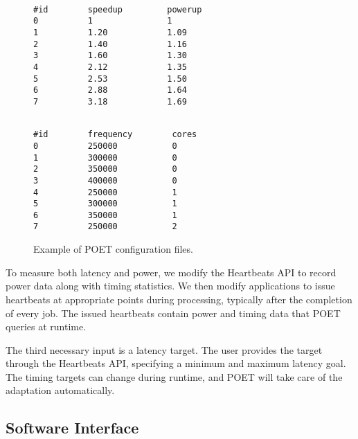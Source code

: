 \begin{figure}[t]
\centering
\begin{minipage}{.45\columnwidth}
\lstset{
  belowskip=0pt,
  aboveskip=0pt,
}
\begin{lstlisting}[frame=tlr,%
  caption={System-agnostic.},%
  label={lst:control_config_example}]%

#id        speedup         powerup
0          1               1
1          1.20            1.09
2          1.40            1.16
3          1.60            1.30
4          2.12            1.35
5          2.53            1.50
6          2.88            1.64
7          3.18            1.69
\end{lstlisting}
\end{minipage}
\hspace*{0.4cm}
\begin{minipage}{.45\columnwidth}
\lstset{
  belowskip=0pt,
  aboveskip=0pt,
}
\begin{lstlisting}[frame=tlr,%
  caption={System-specific.},%
  label={lst:cpu_config_example}]%

#id        frequency        cores
0          250000           0
1          300000           0
2          350000           0
3          400000           0
4          250000           1
5          300000           1
6          350000           1
7          250000           2
\end{lstlisting}
\end{minipage}
\caption{Example of POET configuration files.}
\label{fig:config-examples}
\end{figure}

To measure both latency and power, we modify the Heartbeats API \cite{PTRADE} to record power data along with timing statistics.
We then modify applications to issue heartbeats at appropriate points during processing, typically after the completion of every job.
The issued heartbeats contain power and timing data that POET queries at runtime.

The third necessary input is a latency target.
The user provides the target through the Heartbeats API, specifying a minimum and maximum latency goal.
The timing targets can change during runtime, and POET will take care of the adaptation automatically.


\subsection{Software Interface}
\label{sec:poet-interface}

